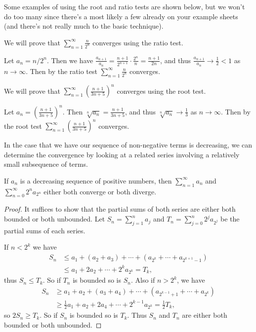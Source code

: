\documentclass[a4paper]{scrartcl}
\begin{document}
Some examples of using the root and ratio tests are shown below, but we won't do too many since there's a most likely a few already on your example sheets (and there's not really much to the basic technique).

\begin{example}
	We will prove that $\sum_{n = 1}^{\infty} \frac{n}{2^n}$ converges using the ratio test.

	Let $a_n = n/2^n$. Then we have $\frac{a_{n + 1}}{a_n} = \frac{n + 1}{2^{n + 1}} \cdot \frac{2^n}{n} = \frac{n + 1}{2n}$, and thus $\frac{a_{n + 1}}{a_n} \rightarrow \frac{1}{2} < 1$ as $n \rightarrow \infty$. Then by the ratio test $\sum_{n = 1}^{\infty} \frac{n}{2^n}$ converges.
\end{example}

\begin{example}
	We will prove that $\sum_{n = 1}^{\infty} \left(\frac{n + 1}{3n + 5}\right)^n$ converges using the root test.

	Let $a_n = (\frac{n + 1}{3n + 5})^n$. Then $\sqrt[n]{a_n} = \frac{n + 1}{3n + 5}$, and thus $\sqrt[n]{a_n} \rightarrow \frac{1}{3}$ as $n \rightarrow \infty$. Then by the root test $\sum_{n = 1}^{\infty} \left(\frac{n + 1}{3n + 5}\right)^n$ converges.
\end{example}

In the case that we have our sequence of non-negative terms is decreasing, we can determine the convergence by looking at a related series involving a relatively small subsequence of terms.

\begin{theorem}
	If $a_n$ is a decreasing sequence of positive numbers, then $\sum_{n = 1}^{\infty} a_n$ and $\sum_{n = 0}^{\infty} 2^n a_{2^n}$ either both converge or both diverge.
\end{theorem}
\begin{proof}
It suffices to show that the partial sums of both series are either both bounded or both unbounded.
Let $S_n = \sum_{j = 1}^{n} a_j$ and $T_n = \sum_{j = 0}^n 2^j a_{2^j}$ be the partial sums of each series.

If $n < 2^k$ we have
\begin{align*}
	S_n &\leq a_1 + (a_2 + a_3) + \cdots + (a_{2^k} + \cdots + a_{2^{k + 1} - 1}) \\
	&\leq a_1 + 2 a_2 + \cdots + 2^k a_{2^k} = T_k,
\end{align*}
thus $S_n \leq T_k$. So if $T_n$ is bounded so is $S_n$. Also if $n > 2^k$, we have
\begin{align*}
	S_n &\geq a_1 + a_2 + (a_3 + a_4) + \cdots + (a_{2^{k -1}+1} + \cdots + a_{2^k}) \\
	&\geq \frac{1}{2}a_1 + a_2 + 2 a_4 + \cdots + 2^{k - 1}a_{2^k} = \frac{1}{2}T_k,
\end{align*}
so $2S_n \geq T_k$. So if $S_n$ is bounded so is $T_k$.
Thus $S_n$ and $T_n$ are either both bounded or both unbounded. 
\end{proof}
\end{document}
